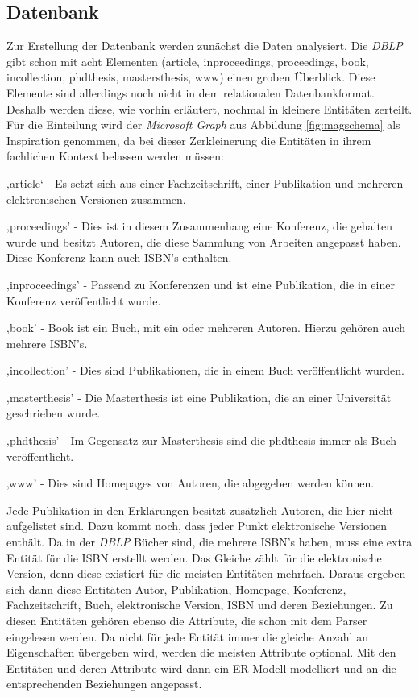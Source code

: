 \subsection{Datenbank}

Zur Erstellung der Datenbank werden zunächst die Daten analysiert. Die \textit{DBLP} gibt schon mit acht Elementen (article, inproceedings, proceedings, book, incollection, phdthesis, mastersthesis, www) einen groben Überblick. Diese Elemente sind allerdings noch nicht in dem relationalen Datenbankformat. Deshalb werden diese, wie vorhin erläutert, nochmal in kleinere Entitäten zerteilt. 
Für die Einteilung wird der \textit{Microsoft Graph} aus Abbildung \ref{fig:magschema} als Inspiration genommen, da bei dieser Zerkleinerung die Entitäten in ihrem fachlichen Kontext belassen werden müssen:

‚article‘ - Es setzt sich aus einer Fachzeitschrift, einer Publikation und mehreren elektronischen Versionen zusammen.

‚proceedings’ - Dies ist in diesem Zusammenhang eine Konferenz, die gehalten wurde
und besitzt Autoren, die diese Sammlung von Arbeiten angepasst haben. Diese Konferenz
kann auch ISBN’s enthalten.

‚inproceedings’ - Passend zu Konferenzen und ist eine Publikation, die in einer Konferenz veröffentlicht wurde.

‚book’ - Book ist ein Buch, mit ein oder mehreren Autoren. Hierzu gehören auch mehrere ISBN’s.

‚incollection’ - Dies sind Publikationen, die in einem Buch veröffentlicht wurden.

‚masterthesis’ - Die Masterthesis ist eine Publikation, die an einer Universität geschrieben wurde.

‚phdthesis’ - Im Gegensatz zur Masterthesis sind die phdthesis immer als Buch veröffentlicht.

‚www’ - Dies sind Homepages von Autoren, die abgegeben werden können.

Jede Publikation in den Erklärungen besitzt zusätzlich Autoren, die hier nicht aufgelistet sind. Dazu kommt noch, dass jeder Punkt elektronische Versionen enthält. Da in der \textit{DBLP} Bücher sind, die mehrere ISBN’s haben, muss eine extra Entität für die ISBN erstellt werden. Das Gleiche zählt für die elektronische Version, denn diese existiert für die meisten Entitäten mehrfach. Daraus ergeben sich dann diese Entitäten Autor, Publikation, Homepage, Konferenz, Fachzeitschrift, Buch, elektronische Version, ISBN und deren Beziehungen. Zu diesen Entitäten gehören ebenso die Attribute, die schon mit dem Parser eingelesen werden. Da nicht für jede Entität immer die gleiche Anzahl an Eigenschaften übergeben wird, werden die meisten Attribute optional. Mit den Entitäten und deren Attribute wird dann ein ER-Modell modelliert und an die entsprechenden Beziehungen angepasst.



